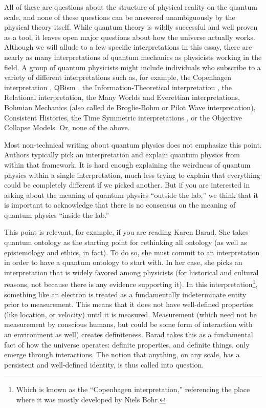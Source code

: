 \documentclass[onecolumn,preprintnumbers,amsmath,amssymbn,reprint,nofootinbib,superscriptaddress]{revtex4}    %
\begin{document}
All of these are questions about the structure of physical reality on the quantum scale, and none of these questions can be answered unambiguously by the physical theory itself.  While quantum theory is wildly successful and well proven as a tool, it leaves open major questions about how the universe actually works. Although we will allude to a few specific interpretations in this essay, there are nearly as many interpretations of quantum mechanics as physicists working in the field.  
A group of quantum physicists might include individuals who subscribe to a variety of different interpretations \cite{interpretations} such as, for example, the Copenhagen interpretation \cite{copenhagen}, QBism \cite{qbism}, the Information-Theoretical interpretation \cite{information,Bub}, the Relational interpretation\cite{Bitbol, Rovelli}, the Many Worlds and Everettian interpretations\cite{manyworlds}, Bohmian Mechanics (also called de Broglie-Bohm or Pilot Wave interpretation)\cite{bohm}, Consistent Histories\cite{histories}, the Time Symmetric interpretations \cite{retrocausal, aharonov,Wharton07}, or the Objective Collapse Models\cite{collapse}.  Or, none of the above.

Most non-technical writing about quantum physics does not emphasize this point.  Authors typically pick an interpretation and explain quantum physics from within that framework. It is hard enough explaining the weirdness of quantum physics within a single interpretation, much less trying to explain that everything could be completely different if we picked another.  But if you are interested in asking about the meaning of quantum physics ``outside the lab,'' we think that it is important to acknowledge that there is no consensus on the meaning of quantum physics ``inside the lab.''  

This point is relevant, for example, if you are reading Karen Barad. She takes quantum ontology as the starting point for rethinking all ontology (as well as epistemology and ethics, in fact). To do so, she must commit to an interpretation in order to have a quantum ontology to start with.  In her case, she picks an interpretation that is widely favored among physicists (for historical and cultural reasons, not because there is any evidence supporting it).  In this interpretation\footnote{Which is known as the ``Copenhagen interpretation,'' referencing the place where it was mostly developed by Niels Bohr.}, something like an electron is treated as a fundamentally indeterminate entity prior to measurement.  This means that it does not have well-defined properties (like location, or velocity) until it is measured.  Measurement (which need not be measurement by conscious humans, but could be some form of interaction with an environment as well) creates definiteness.  Barad takes this as a fundamental fact of how the universe operates:  definite properties, and definite things, only emerge through interactions.  The notion that anything, on any scale, has a persistent and well-defined identity, is thus called into question.  
\end{document}
